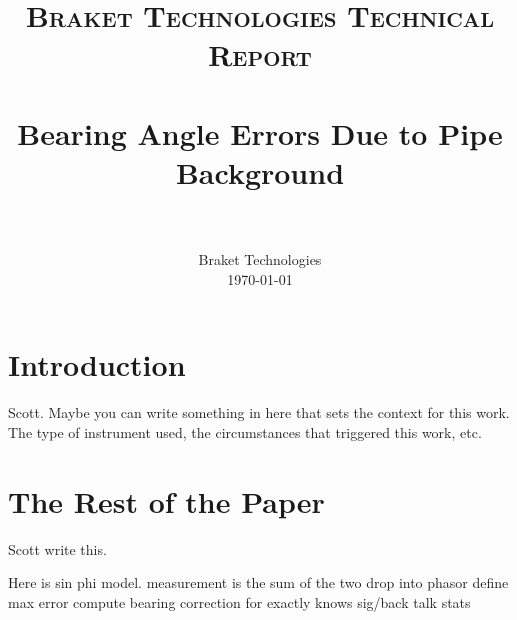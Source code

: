 \documentclass[paper=a4, fontsize=11pt]{scrartcl}
\title{
		\usefont{OT1}{bch}{b}{n}
		\normalfont \normalsize \textsc{Braket Technologies Technical Report} \\ [25pt]
		\horrule{0.5pt} \\[0.4cm]
		\huge Bearing Angle Errors Due to Pipe Background \\
		\horrule{2pt} \\[0.5cm]
}
\author{
		\normalfont 								\normalsize
        Braket Technologies\\[-3pt]		\normalsize
        \today
}
\date{}
\numberwithin{equation}{section}		%
\numberwithin{figure}{section}			%
\numberwithin{table}{section}				%
\begin{document}
\maketitle
\section{Introduction}
Scott.  Maybe you can write something in here that sets the context for this work.  The type of instrument used, the circumstances that triggered this work, etc.

\section{The Rest of the Paper}
Scott write this.

Here is sin phi model.
measurement is the sum of the two
drop into phasor
define max error
compute bearing correction for exactly knows sig/back
talk stats
\end{document}
